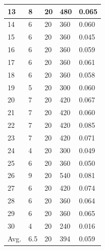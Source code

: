 \documentclass[runningheads]{llncs}
\begin{document}
\begin{table}[]
\begin{tabular}{|l|l|l|l|l|}
        13 & 8 & 20 & 480 & 0.065 \\ \hline
        14 & 6 & 20 & 360 & 0.060 \\ \hline
        15 & 6 & 20 & 360 & 0.045 \\ \hline
        16 & 6 & 20 & 360 & 0.059 \\ \hline
        17 & 6 & 20 & 360 & 0.061 \\ \hline
        18 & 6 & 20 & 360 & 0.058 \\ \hline
        19 & 5 & 20 & 300 & 0.060 \\ \hline
        20 & 7 & 20 & 420 & 0.067 \\ \hline
        21 & 7 & 20 & 420 & 0.060 \\ \hline
        22 & 7 & 20 & 420 & 0.085 \\ \hline
        23 & 7 & 20 & 420 & 0.071 \\ \hline
        24 & 4 & 20 & 300 & 0.049 \\ \hline
        25 & 6 & 20 & 360 & 0.050 \\ \hline
        26 & 9 & 20 & 540 & 0.081 \\ \hline
        27 & 6 & 20 & 420 & 0.074 \\ \hline
        28 & 6 & 20 & 360 & 0.064 \\ \hline
        29 & 6 & 20 & 360 & 0.065 \\ \hline
        30 & 4 & 20 & 240 & 0.016 \\ \hline
        Avg. & 6.5 & 20 & 394 & 0.059 \\ \hline
        \end{tabular}
        \end{table}
\end{document}
